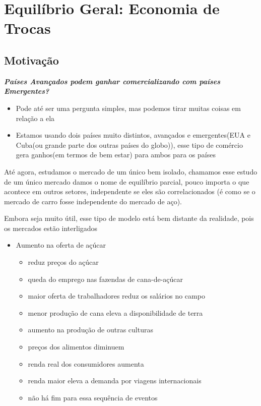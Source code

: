 \documentclass[a4paper,12pt]{article}[abntex2]
\begin{document}
\section{\textbf{Equilíbrio Geral: Economia de Trocas}}
\subsection{\textbf{Motivação}}
\textit{\textbf{Países Avançados podem ganhar comercializando com países Emergentes?}}
\begin{itemize}
    \item Pode até ser uma pergunta simples, mas podemos tirar muitas coisas em relação a ela 
    \item Estamos usando dois países muito distintos, avançados e emergentes(EUA e Cuba(ou grande parte dos outras países do globo)), esse tipo de comércio gera ganhos(em termos de bem estar) para ambos para os países
\end{itemize}
Até agora, estudamos o mercado de um único bem isolado, chamamos esse estudo de um único mercado damos o nome de equilíbrio parcial, pouco importa o que acontece em outros setores, independente se eles são correlacionados (é como se o mercado de carro fosse independente do mercado de aço).

Embora seja muito útil, esse tipo de modelo está bem distante da realidade, pois os mercados estão interligados\begin{itemize}
    \item Aumento na oferta de açúcar\begin{itemize}
        \item reduz preços do açúcar
        \item queda do emprego nas fazendas de cana-de-açúcar
        \item maior oferta de trabalhadores reduz os salários no campo 
        \item menor produção de cana eleva a disponibilidade de terra 
        \item aumento na produção de outras culturas
        \item preços dos alimentos diminuem
        \item renda real dos consumidores aumenta
        \item renda maior eleva a demanda por viagens internacionais 
        \item não há fim para essa sequência de eventos
        \end{itemize}
    \end{itemize}
\end{document}
